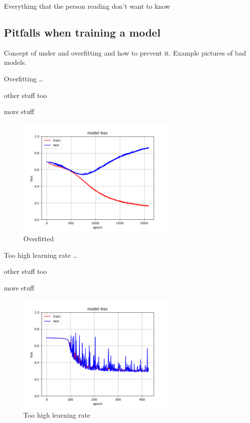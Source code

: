 Everything that the person reading don't want to know


\subsection{Pitfalls when training a model}
Concept of under and overfitting and how to prevent it. Example pictures of bad models.

Overfitting \dots

other stuff too

more stuff

\begin{figure}[H] %
\center
\includegraphics[width=0.7\textwidth]{pictures/overfit.png}
\caption{\label{fig:overfit}Overfitted}
\end{figure}

Too high learning rate \dots

other stuff too

more stuff

\begin{figure}[H]
\center
\includegraphics[width=0.7\textwidth]{pictures/high_lr.png}
\caption{\label{fig:high_lr}Too high learning rate}
\end{figure}


